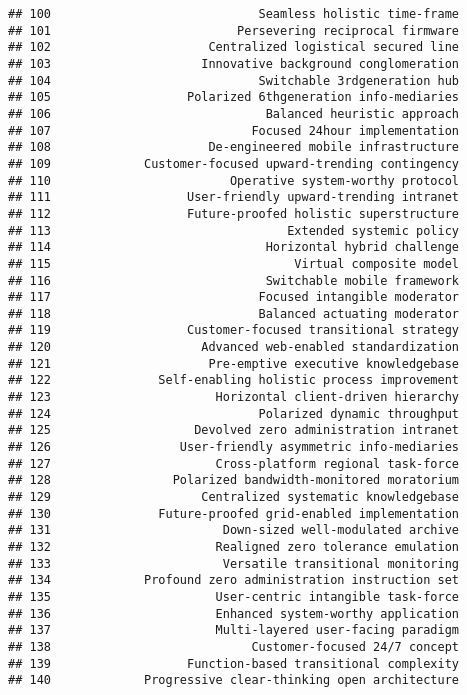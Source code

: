 \documentclass[
]{article}
\begin{document}
\begin{verbatim}
## 100                             Seamless holistic time-frame
## 101                          Persevering reciprocal firmware
## 102                      Centralized logistical secured line
## 103                     Innovative background conglomeration
## 104                             Switchable 3rdgeneration hub
## 105                   Polarized 6thgeneration info-mediaries
## 106                              Balanced heuristic approach
## 107                            Focused 24hour implementation
## 108                      De-engineered mobile infrastructure
## 109             Customer-focused upward-trending contingency
## 110                         Operative system-worthy protocol
## 111                   User-friendly upward-trending intranet
## 112                   Future-proofed holistic superstructure
## 113                                 Extended systemic policy
## 114                              Horizontal hybrid challenge
## 115                                  Virtual composite model
## 116                              Switchable mobile framework
## 117                             Focused intangible moderator
## 118                             Balanced actuating moderator
## 119                   Customer-focused transitional strategy
## 120                     Advanced web-enabled standardization
## 121                      Pre-emptive executive knowledgebase
## 122               Self-enabling holistic process improvement
## 123                       Horizontal client-driven hierarchy
## 124                             Polarized dynamic throughput
## 125                    Devolved zero administration intranet
## 126                  User-friendly asymmetric info-mediaries
## 127                       Cross-platform regional task-force
## 128                 Polarized bandwidth-monitored moratorium
## 129                     Centralized systematic knowledgebase
## 130               Future-proofed grid-enabled implementation
## 131                        Down-sized well-modulated archive
## 132                       Realigned zero tolerance emulation
## 133                        Versatile transitional monitoring
## 134             Profound zero administration instruction set
## 135                       User-centric intangible task-force
## 136                       Enhanced system-worthy application
## 137                       Multi-layered user-facing paradigm
## 138                            Customer-focused 24/7 concept
## 139                   Function-based transitional complexity
## 140             Progressive clear-thinking open architecture

\end{verbatim}
\end{document}
